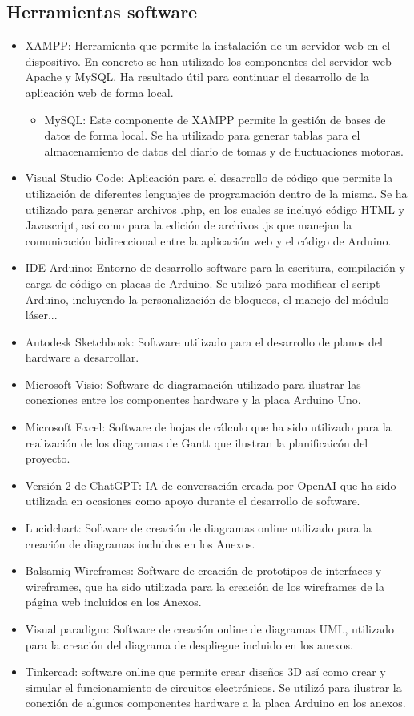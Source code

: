 \subsection{Herramientas software}
\begin{itemize}
    \item XAMPP: Herramienta que permite la instalación de un servidor web en el dispositivo. En concreto se han utilizado los componentes del servidor web Apache y MySQL. Ha resultado útil para continuar el desarrollo de la aplicación web de forma local.
    \begin{itemize}
    \item MySQL: Este componente de XAMPP permite la gestión de bases de datos de forma local. Se ha utilizado para generar tablas para el almacenamiento de datos del diario de tomas y de fluctuaciones motoras.
    \end{itemize}
    \item Visual Studio Code: Aplicación para el desarrollo de código que permite la utilización de diferentes lenguajes de programación dentro de la misma. Se ha utilizado para generar archivos .php, en los cuales se incluyó código HTML y Javascript, así como para la edición de archivos .js que manejan la comunicación bidireccional entre la aplicación web y el código de Arduino.
    \item IDE Arduino: Entorno de desarrollo software para la escritura, compilación y carga de código en placas de Arduino. Se utilizó para modificar el script Arduino, incluyendo la personalización de bloqueos, el manejo del módulo láser...
    \item Autodesk Sketchbook: Software utilizado para el desarrollo de planos del hardware a desarrollar.
    \item Microsoft Visio: Software de diagramación utilizado para ilustrar las conexiones entre los componentes hardware y la placa Arduino Uno.
    \item Microsoft Excel: Software de hojas de cálculo que ha sido utilizado para la realización de los diagramas de Gantt que ilustran la planificaicón del proyecto.
    \item Versión 2 de ChatGPT: IA de conversación creada por OpenAI que ha sido utilizada en ocasiones como apoyo durante el desarrollo de software.
    \item Lucidchart: Software de creación de diagramas online utilizado para la creación de diagramas incluidos en los Anexos.
    \item Balsamiq Wireframes: Software de creación de prototipos de interfaces y wireframes, que ha sido utilizada para la creación de los wireframes de la página web incluidos en los Anexos.
    \item Visual paradigm: Software de creación online de diagramas UML, utilizado para la creación del diagrama de despliegue incluido en los anexos.
    \item Tinkercad: software online que permite crear diseños 3D así como crear y simular el funcionamiento de circuitos electrónicos. Se utilizó para ilustrar la conexión de algunos componentes hardware a la placa Arduino en los anexos.
\end{itemize}
